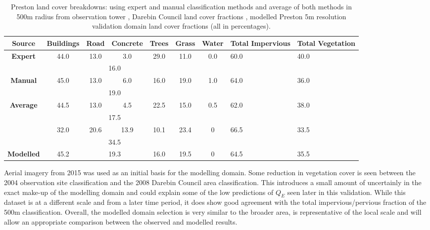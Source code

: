 \documentclass[final,3p,times,authoryear]{elsarticle}
\begin{document}
\begin{table}[!htbp]
\caption
{Preston land cover breakdowns: using expert and manual classification methods and average of both methods in 500m radius from observation tower \citep{Coutts2007}, Darebin Council land cover fractions \citep{Nury2015}, modelled Preston 5m resolution validation domain land cover fractions (all in percentages). \label{tab:expertValues}} 
  \begin{tabular}{ |c |c| c | c |c |c |c|p{1.65cm}|p{1.65cm}| } 
	\hline \textbf{Source}   & \textbf{Buildings}&	\textbf{Road}&\textbf{Concrete}	&\textbf{Trees}&\textbf{Grass}&\textbf{Water}&\textbf{Total Impervious}&\textbf{Total Vegetation} \\ \hline
 \textbf{Expert}&	44.0&	13.0&	3.0&	29.0&	11.0	&0.0	&	60.0&	40.0 \\ \hline 
 && \multicolumn{2}{|c|}{16.0} 	&&&&&\\ \hline  
 \textbf{Manual}&	45.0	&13.0	&6.0&	16.0&	19.0&	1.0&		64.0&	36.0 \\ \hline
 && \multicolumn{2}{|c|}{19.0} 	&&&&&\\ \hline 
 \textbf{Average} &	44.5&	13.0&	4.5&	22.5&	15.0&	0.5&		62.0&	38.0 \\ \hline
 && \multicolumn{2}{|c|}{17.5} 	&&&&&\\ \hline  
\textbf{\cite{Nury2015}}& 32.0&	20.6&	13.9&	10.1&	23.4&	0&		66.5&	33.5 \\ \hline
 & & \multicolumn{2}{|c|}{34.5} 	&&&&&\\ \hline	
\textbf{Modelled} & 45.2	& \multicolumn{2}{|c|}{19.3} & 16.0	& 19.5 &0& 64.5 &35.5 \\ \hline
  \end{tabular} 
 \end{table}  

Aerial imagery from 2015 was used as an initial basis for the modelling domain. Some reduction in vegetation cover is seen between the 2004 observation site classification and the 2008 Darebin Council area classification. This introduces a small amount of uncertainly in the exact make-up of the modelling domain and could explain some of the low predictions of $Q_{E}$ seen later in this validation. While this dataset is at a different scale and from a later time period, it does show good agreement with the total impervious/pervious fraction of the 500m classification. Overall, the modelled domain selection is very similar to the broader area, is representative of the local scale and will allow an appropriate comparison between the observed and modelled results. 
\end{document}
